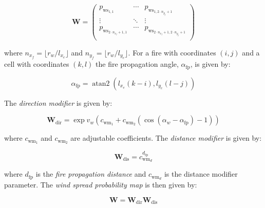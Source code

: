 \documentclass[conference]{IEEEtran}
\DeclareMathOperator{\atantwo}{atan2}
\begin{document}
\begin{equation} \label{eq:w}
\bm{W} = 
    \begin{pmatrix}
        p_{\text{ws}_{1,1}} & \cdots & p_{\text{ws}_{1,2 \cdot n_{y_{f}} + 1}}\\
        \vdots & \ddots & \vdots \\
         p_{\text{ws}_{2 \cdot n_{x_{f}}+1,1}} & \cdots & p_{\text{ws}_{2 \cdot n_{x_{f}} + 1, 2 \cdot n_{y_{f}} + 1}}\\
    \end{pmatrix}
\end{equation}

where $n_{x_{f}} = \lfloor r_{w}/l_{x_{e}} \rfloor$ and $n_{y_{f}} = \lfloor r_{w}/l_{y_{e}} \rfloor$.
For a fire with coordinates $(i,j)$ and a cell with coordinates $(k,l)$ the fire propagation angle, $\alpha_{\text{fp}}$, is given by:

\begin{equation}
    \alpha_{\text{fp}} = \atantwo (l_{x_{e}}(k - i), l_{y_{e}}(l - j))
\end{equation}

The \textit{direction modifier} is given by:

\begin{equation}
    \bm{W}_{\text{dir}} = \exp{v_{w} ( c_{\text{wm}_{1}} + c_{\text{wm}_{2}} (\cos (\alpha_{w} - \alpha_{\text{fp}}) - 1)) }
\end{equation}

where $c_{\text{wm}_{1}}$ and $c_{\text{wm}_{2}}$ are adjustable coefficients.
The \textit{distance modifier} is given by:

\begin{equation}
    \bm{W}_{\text{dis}} = c_{\text{wm}_{d}}^{d_{\text{fp}}}
\end{equation}

where $d_{\text{fp}}$ is the \textit{fire propagation distance} and $c_{\text{wm}_{d}}$ is the distance modifier parameter.
The \textit{wind spread probability map} is then given by:

\begin{equation}
    \bm{W} = \bm{W}_{\text{dir}} \bm{W}_{\text{dis}}
\end{equation}


\end{document}
